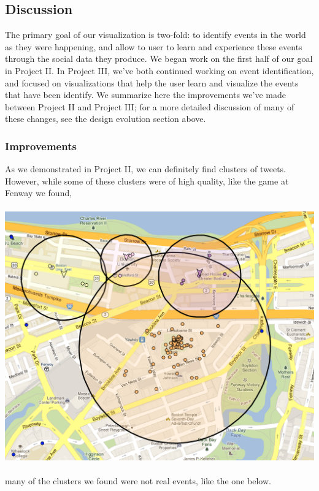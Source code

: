 \documentclass[pdftex,12pt,a4paper]{article}
\begin{document}
\subsection{Discussion}
The primary goal of our visualization is two-fold: to identify events in the world as they were happening, and allow to user to learn and experience these events through the social data they produce. We began work on the first half of our goal in Project II. In Project III, we've both continued working on event identification, and focused on visualizations that help the user learn and visualize the events that have been identify. We summarize here the improvements we've made between Project II and Project III; for a more detailed discussion of many of these changes, see the design evolution section above.

\subsubsection{Improvements}
As we demonstrated in Project II, we can definitely find clusters of tweets. However, while some of these clusters were of high quality, like the game at Fenway we found, \\ \\
\includegraphics[width=5.5in]{fenway1.png} \\ \\
many of the clusters we found were not real events, like the one below.
\end{document}
